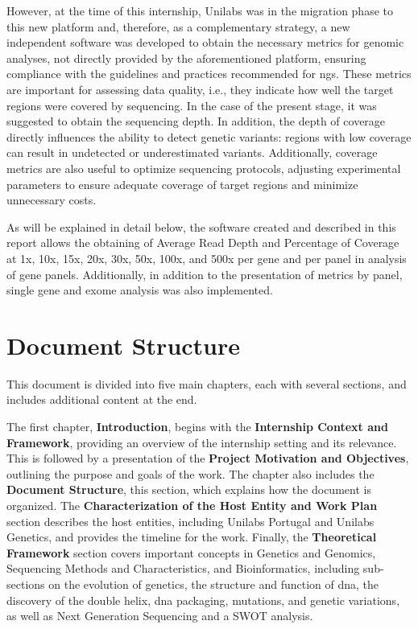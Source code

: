 However, at the time of this internship, Unilabs was in the migration phase to this new platform and, therefore, as a complementary strategy, a new independent software was developed to obtain the necessary metrics for genomic analyses, not directly provided by the aforementioned platform, ensuring compliance with the guidelines and practices recommended for \ac{ngs}. These metrics are important for assessing data quality, i.e., they indicate how well the target regions were covered by sequencing. In the case of the present stage, it was suggested to obtain the sequencing depth. In addition, the depth of coverage directly influences the ability to detect genetic variants: regions with low coverage can result in undetected or underestimated variants. Additionally, coverage metrics are also useful to optimize sequencing protocols, adjusting experimental parameters to ensure adequate coverage of target regions and minimize unnecessary costs. 

As will be explained in detail below, the software created and described in this report allows the obtaining of Average Read Depth and Percentage of Coverage at 1x, 10x, 15x, 20x, 30x, 50x, 100x, and 500x per gene and per panel in analysis of gene panels. Additionally, in addition to the presentation of metrics by panel, single gene and exome analysis was also implemented.

\section{Document Structure} \label{sec:doc_structure}
This document is divided into five main chapters, each with several sections, and includes additional content at the end.

The first chapter, \textbf{Introduction}, begins with the \textbf{Internship Context and Framework}, providing an overview of the internship setting and its relevance. This is followed by a presentation of the \textbf{Project Motivation and Objectives}, outlining the purpose and goals of the work. The chapter also includes the \textbf{Document Structure}, this section, which explains how the document is organized. The \textbf{Characterization of the Host Entity and Work Plan} section describes the host entities, including Unilabs Portugal and Unilabs Genetics, and provides the timeline for the work. Finally, the \textbf{Theoretical Framework} section covers important concepts in Genetics and Genomics, Sequencing Methods and Characteristics, and Bioinformatics, including sub-sections on the evolution of genetics, the structure and function of \ac{dna}, the discovery of the double helix, \ac{dna} packaging, mutations, and genetic variations, as well as Next Generation Sequencing and a SWOT analysis.

